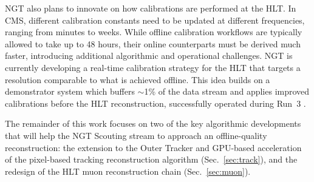 \documentclass{webofc}
\begin{document}
%
NGT also plans to innovate on how calibrations are performed at the HLT.
In CMS, different calibration constants need to be updated at different frequencies, ranging from minutes to weeks.
While offline calibration workflows are typically allowed to take up to 48 hours, their online counterparts must be derived much faster, introducing additional algorithmic and operational challenges.
NGT is currently developing a real-time calibration strategy for the HLT that targets a resolution comparable to what is achieved offline.
This idea builds on a demonstrator system which buffers $\sim$1\% of the data stream and applies improved calibrations before the HLT reconstruction, successfully operated during Run~3 \cite{demonstrator}. \par
%
The remainder of this work focuses on two of the key algorithmic developments that will help the NGT Scouting stream to approach an offline-quality reconstruction: the extension to the Outer Tracker and GPU-based acceleration of the pixel-based tracking reconstruction algorithm (Sec.~\ref{sec:track}), and the redesign of the HLT muon reconstruction chain (Sec.~\ref{sec:muon}).
%
\end{document}
